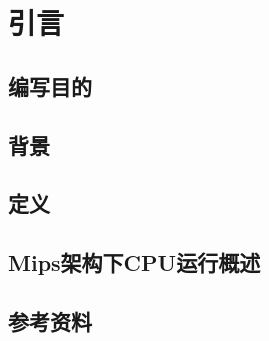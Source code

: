 \newpage
\section{引言}
\subsection{编写目的}
\subsection{背景}
\subsection{定义}
\subsection{Mips架构下CPU运行概述}
\subsection{参考资料}

